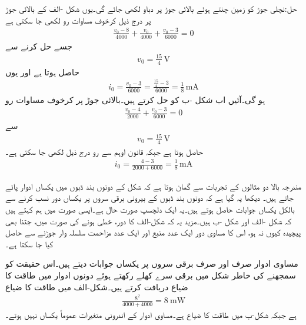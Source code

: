 حل:نچلی جوڑ کو زمین چنتے ہوئے بالائی جوڑ پر دباو  لکھی جائے گی۔یوں  شکل -الف کے بالائی جوڑ پر درج ذیل کرخوف مساوات رو لکھی جا سکتی ہے
\begin{align*}
\frac{v_0-8}{4000}+\frac{v_0}{4000}+\frac{v_0-3}{6000}=0
\end{align*}
جسے حل کرنے سے
\begin{align*}
v_0=\frac{15}{4}\, \si{\volt}
\end{align*}
حاصل ہوتا ہے اور یوں
\begin{align*}
i_0=\frac{v_0-3}{6000}=\frac{\frac{15}{4}-3}{6000}=\frac{1}{8}\,\si{\milli\ampere}
\end{align*}
ہو گی۔آئیں اب شکل  -ب کو حل کرتے ہیں۔بالائی جوڑ پر کرخوف مساوات رو
\begin{align*}
\frac{v_0-4}{2000}+\frac{v_0-3}{6000}=0
\end{align*}
سے
\begin{align*}
v_0=\frac{15}{4}\, \si{\volt}
\end{align*}
حاصل ہوتا ہے جبکہ قانون اوہم سے رو درج ذیل لکھی جا سکتی ہے۔
\begin{align*}
i_0=\frac{4-3}{2000+6000}=\frac{1}{8}\,\si{\milli\ampere}
\end{align*}

مندرجہ بالا دو مثالوں کے تجربات سے گمان ہوتا ہے کہ شکل  کے دونوں بند ڈبوں میں یکساں ادوار پائے جاتے ہیں۔ دیکھا یہ گیا ہے کہ دونوں بند ڈبوں کے بیرونی برقی سروں پر یکساں دور نسب کرنے سے بالکل یکساں جوابات حاصل ہوتے ہیں۔یہ ایک دلچسپ صورت حال ہے۔ایسی صورت میں ہم کہتے ہیں کہ شکل -الف اور شکل -ب  ہیں۔مزید یہ کہ شکل-الف کا دور، خطی ہونے کی صورت میں، جتنا بھی پیچیدہ کیوں نہ ہو، اس کا مساوی دور ایک عدد منبع اور ایک عدد مزاحمت سلسلہ وار جوڑنے سے حاصل کیا جا سکتا ہے۔

مساوی ادوار صرف اور صرف برقی سروں پر یکساں جوابات دیتے ہیں۔اس حقیقت کو سمجھنے کی خاطر شکل  میں برقی سرے کھلے رکھتے ہوئے دونوں ادوار میں طاقت کا ضیاع دریافت کرتے ہیں۔شکل-الف میں طاقت کا ضیاع
\begin{align*}
\frac{8^2}{4000+4000}=\SI{8}{\milli\watt}
\end{align*}
ہے جبکہ شکل-ب میں طاقت کا ضیاع  ہے۔مساوی ادوار کے اندرونی متغیرات عموماً یکساں نہیں ہوتے۔

